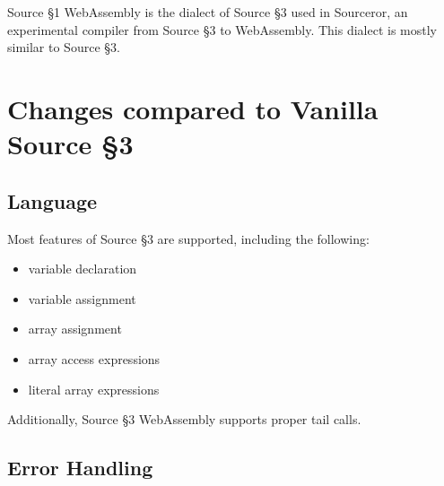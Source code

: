 


\newcommand{\Rule}[2]{\genfrac{}{}{0.7pt}{}{{\setlength{\fboxrule}{0pt}\setlength{\fboxsep}{3mm}\fbox{$#1$}}}{{\setlength{\fboxrule}{0pt}\setlength{\fboxsep}{3mm}\fbox{$#2$}}}}

\newcommand{\TruE}{\textbf{\texttt{true}}}
\newcommand{\FalsE}{\textbf{\texttt{false}}}
\newcommand{\Rc}{\texttt{\}}}
\newcommand{\Lc}{\texttt{\{}}
\newcommand{\Rp}{\texttt{)}}
\newcommand{\Lp}{\texttt{(}}
\newcommand{\Fun}{\textbf{\texttt{function}}}
\newcommand{\Let}{\textbf{\texttt{let}}}
\newcommand{\Return}{\textbf{\texttt{return}}}
\newcommand{\Const}{\textbf{\texttt{const}}}
\newcommand{\If}{\textbf{\texttt{if}}}
\newcommand{\Else}{\textbf{\texttt{else}}}
\newcommand{\Bool}{\texttt{bool}}
\newcommand{\Number}{\texttt{number}}
\newcommand{\String}{\texttt{string}}
\newcommand{\Undefined}{\texttt{undefined}}

\newtheorem{definition}{Definition}[section]



Source \S 1 WebAssembly is the dialect of Source \S 3 used in Sourceror, an experimental compiler from Source \S 3 to WebAssembly.  This dialect is mostly similar to Source \S 3.

\section{Changes compared to Vanilla Source \S 3}

\subsection*{Language}  

Most features of Source \S 3 are supported, including the following: 
\begin{itemize}
\item variable declaration
\item variable assignment
\item array assignment
\item array access expressions
\item literal array expressions
\end{itemize}
Additionally, Source \S 3 WebAssembly supports proper tail calls.

\subsection*{Error Handling}

